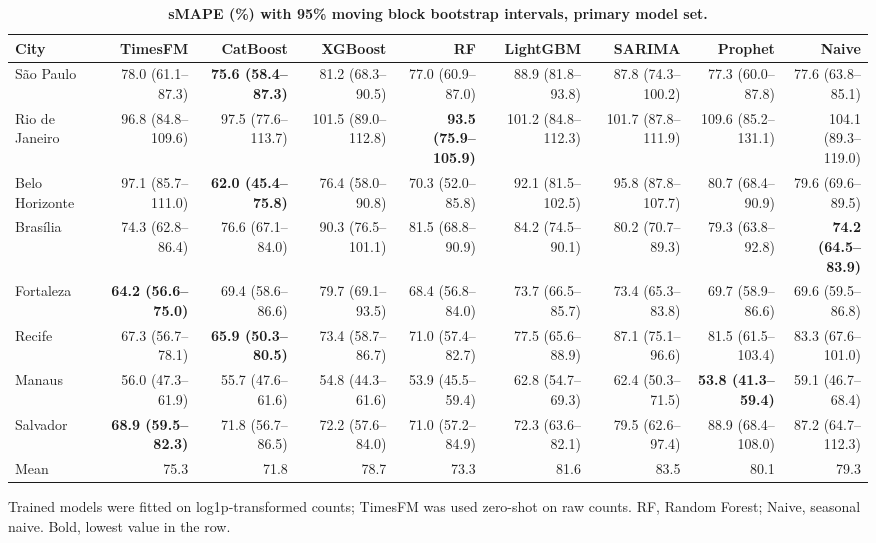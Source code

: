 
\begin{table}[!ht]
\centering
\footnotesize
\setlength{\tabcolsep}{3pt}
\caption{\textbf{sMAPE (\%) with 95\% moving block bootstrap intervals, primary model set.}}
\begin{tabular}{lrrrrrrrr}
\toprule
City & TimesFM & CatBoost & XGBoost & RF & LightGBM & SARIMA & Prophet & Naive \\
\midrule
S\~ao Paulo & 78.0 (61.1--87.3) & \textbf{75.6 (58.4--87.3)} & 81.2 (68.3--90.5) & 77.0 (60.9--87.0) & 88.9 (81.8--93.8) & 87.8 (74.3--100.2) & 77.3 (60.0--87.8) & 77.6 (63.8--85.1) \\
Rio de Janeiro & 96.8 (84.8--109.6) & 97.5 (77.6--113.7) & 101.5 (89.0--112.8) & \textbf{93.5 (75.9--105.9)} & 101.2 (84.8--112.3) & 101.7 (87.8--111.9) & 109.6 (85.2--131.1) & 104.1 (89.3--119.0) \\
Belo Horizonte & 97.1 (85.7--111.0) & \textbf{62.0 (45.4--75.8)} & 76.4 (58.0--90.8) & 70.3 (52.0--85.8) & 92.1 (81.5--102.5) & 95.8 (87.8--107.7) & 80.7 (68.4--90.9) & 79.6 (69.6--89.5) \\
Bras\'ilia & 74.3 (62.8--86.4) & 76.6 (67.1--84.0) & 90.3 (76.5--101.1) & 81.5 (68.8--90.9) & 84.2 (74.5--90.1) & 80.2 (70.7--89.3) & 79.3 (63.8--92.8) & \textbf{74.2 (64.5--83.9)} \\
Fortaleza & \textbf{64.2 (56.6--75.0)} & 69.4 (58.6--86.6) & 79.7 (69.1--93.5) & 68.4 (56.8--84.0) & 73.7 (66.5--85.7) & 73.4 (65.3--83.8) & 69.7 (58.9--86.6) & 69.6 (59.5--86.8) \\
Recife & 67.3 (56.7--78.1) & \textbf{65.9 (50.3--80.5)} & 73.4 (58.7--86.7) & 71.0 (57.4--82.7) & 77.5 (65.6--88.9) & 87.1 (75.1--96.6) & 81.5 (61.5--103.4) & 83.3 (67.6--101.0) \\
Manaus & 56.0 (47.3--61.9) & 55.7 (47.6--61.6) & 54.8 (44.3--61.6) & 53.9 (45.5--59.4) & 62.8 (54.7--69.3) & 62.4 (50.3--71.5) & \textbf{53.8 (41.3--59.4)} & 59.1 (46.7--68.4) \\
Salvador & \textbf{68.9 (59.5--82.3)} & 71.8 (56.7--86.5) & 72.2 (57.6--84.0) & 71.0 (57.2--84.9) & 72.3 (63.6--82.1) & 79.5 (62.6--97.4) & 88.9 (68.4--108.0) & 87.2 (64.7--112.3) \\
\midrule
Mean & 75.3 & 71.8 & 78.7 & 73.3 & 81.6 & 83.5 & 80.1 & 79.3 \\
\bottomrule
\end{tabular}
\begin{flushleft} Trained models were fitted on log1p-transformed counts; TimesFM was used zero-shot on raw counts. RF, Random Forest; Naive, seasonal naive. Bold, lowest value in the row.
\end{flushleft}
\label{tabA}
\end{table}
